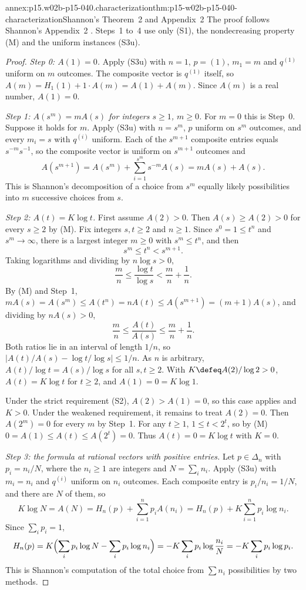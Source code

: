 \begin{annexitem}{annex:p15.w02b-p15-040.characterization}{thm:p15-w02b-p15-040-characterization}{Shannon's Theorem~2 and Appendix~2}
The proof follows Shannon's Appendix~2
\cite[pp.~28--29]{Shannon1948MathematicalTheory}. Steps~1 to~4 use only
(S1), the nondecreasing property (M) and the uniform instances (S3u).
\begin{proof}
\emph{Step 0: \(A(1)=0\).} Apply (S3u) with \(n=1\), \(p=(1)\),
\(m_1=m\) and \(q^{(1)}\) uniform on \(m\) outcomes. The composite vector
is \(q^{(1)}\) itself, so \(A(m)=H_1(1)+1\cdot A(m)=A(1)+A(m)\). Since
\(A(m)\) is a real number, \(A(1)=0\).

\emph{Step 1: \(A(s^m)=mA(s)\) for integers \(s\geq1\), \(m\geq0\).}
For \(m=0\) this is Step~0. Suppose it holds for \(m\). Apply (S3u) with
\(n=s^m\), \(p\) uniform on \(s^m\) outcomes, and every \(m_i=s\) with
\(q^{(i)}\) uniform. Each of the \(s^{m+1}\) composite entries equals
\(s^{-m}s^{-1}\), so the composite vector is uniform on \(s^{m+1}\)
outcomes and
\[
 A(s^{m+1})=A(s^m)+\sum_{i=1}^{s^m}s^{-m}A(s)=mA(s)+A(s).
\]
This is Shannon's decomposition of a choice from \(s^m\) equally likely
possibilities into \(m\) successive choices from \(s\).

\emph{Step 2: \(A(t)=K\log t\).} First assume \(A(2)>0\). Then
\(A(s)\geq A(2)>0\) for every \(s\geq2\) by (M). Fix integers
\(s,t\geq2\) and \(n\geq1\). Since \(s^0=1\leq t^n\) and \(s^m\to\infty\),
there is a largest integer \(m\geq0\) with \(s^m\leq t^n\), and then
\[
 s^m\leq t^n<s^{m+1}.
\]
Taking logarithms and dividing by \(n\log s>0\),
\[
 \frac mn\leq\frac{\log t}{\log s}<\frac mn+\frac1n .
\]
By (M) and Step~1,
\(mA(s)=A(s^m)\leq A(t^n)=nA(t)\leq A(s^{m+1})=(m+1)A(s)\), and
dividing by \(nA(s)>0\),
\[
 \frac mn\leq\frac{A(t)}{A(s)}\leq\frac mn+\frac1n .
\]
Both ratios lie in an interval of length \(1/n\), so
\(\bigl|A(t)/A(s)-\log t/\log s\bigr|\leq1/n\). As \(n\) is arbitrary,
\(A(t)/\log t=A(s)/\log s\) for all \(s,t\geq2\). With
\(K\defeq A(2)/\log2>0\), \(A(t)=K\log t\) for \(t\geq2\), and
\(A(1)=0=K\log1\).

Under the strict requirement (S2), \(A(2)>A(1)=0\), so this case
applies and \(K>0\). Under the weakened requirement, it remains to treat
\(A(2)=0\). Then \(A(2^m)=0\) for every \(m\) by Step~1. For any
\(t\geq1\), \(1\leq t<2^t\), so by (M)
\(0=A(1)\leq A(t)\leq A(2^t)=0\). Thus \(A(t)=0=K\log t\) with \(K=0\).

\emph{Step 3: the formula at rational vectors with positive entries.}
Let \(p\in\Delta_n\) with \(p_i=n_i/N\), where the \(n_i\geq1\) are
integers and \(N=\sum_in_i\). Apply (S3u) with \(m_i=n_i\) and
\(q^{(i)}\) uniform on \(n_i\) outcomes. Each composite entry is
\(p_i/n_i=1/N\), and there are \(N\) of them, so
\[
 K\log N=A(N)=H_n(p)+\sum_{i=1}^np_iA(n_i)=H_n(p)+K\sum_{i=1}^np_i\log n_i .
\]
Since \(\sum_ip_i=1\),
\[
 H_n(p)=K\Bigl(\sum_ip_i\log N-\sum_ip_i\log n_i\Bigr)
   =-K\sum_ip_i\log\frac{n_i}N=-K\sum_ip_i\log p_i .
\]
This is Shannon's computation of the total choice from \(\sum n_i\)
possibilities by two methods.


\end{proof}
\end{annexitem}
